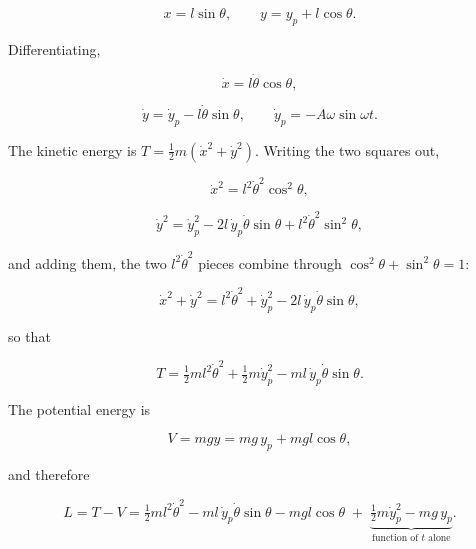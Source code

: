 \documentclass[11pt,a4paper]{article}
\begin{document}
\begin{equation}
x = l\sin\theta,\qquad y = y_p + l\cos\theta. \tag{1}
\end{equation}

Differentiating,

\begin{equation}
\dot x = l\dot\theta\cos\theta, \tag{2}
\end{equation}

\begin{equation}
\dot y = \dot y_p - l\dot\theta\sin\theta,\qquad
  \dot y_p = -A\omega\sin\omega t. \tag{3}
\end{equation}

The kinetic energy is \(T=\tfrac12 m(\dot x^2+\dot y^2)\). Writing the two squares
out,

\begin{equation}
\dot x^2 = l^2\dot\theta^2\cos^2\theta, \tag{4}
\end{equation}

\begin{equation}
\dot y^2 = \dot y_p^2 - 2l\,\dot y_p\dot\theta\sin\theta
            + l^2\dot\theta^2\sin^2\theta, \tag{5}
\end{equation}

and adding them, the two \(l^2\dot\theta^2\) pieces combine through
\(\cos^2\theta+\sin^2\theta=1\):

\begin{equation}
\dot x^2+\dot y^2 = l^2\dot\theta^2 + \dot y_p^2
    - 2l\,\dot y_p\dot\theta\sin\theta, \tag{6}
\end{equation}

so that

\begin{equation}
T = \tfrac12 m l^2\dot\theta^2 + \tfrac12 m\dot y_p^2
      - m l\,\dot y_p\dot\theta\sin\theta. \tag{7}
\end{equation}

The potential energy is

\begin{equation}
V = mgy = mg\,y_p + mgl\cos\theta, \tag{8}
\end{equation}

and therefore

\begin{equation}
L = T-V = \tfrac12 m l^2\dot\theta^2
      - m l\,\dot y_p\dot\theta\sin\theta
      - mgl\cos\theta
      \;+\;\underbrace{\tfrac12 m\dot y_p^2 - mg\,y_p}_{\text{function of }t
      \text{ alone}}. \tag{9}
\end{equation}
\end{document}
